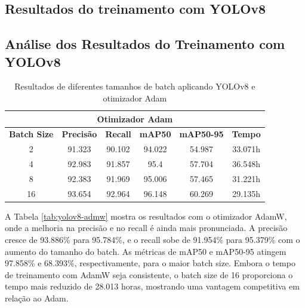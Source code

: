 \subsection{Resultados do treinamento com YOLOv8}

\subsection{Análise dos Resultados do Treinamento com YOLOv8}

\begin{table}[!hbt]
    \centering
    \begin{tabular}{|c|c|c|c|c|c|}
    \hline
    \multicolumn{6}{|c|}{\textbf{Otimizador Adam}} \\ \hline
    \textbf{Batch Size} & \textbf{Precisão} & \textbf{Recall} & \textbf{mAP50} & \textbf{mAP50-95} & \textbf{Tempo} \\ \hline
    2                   & 91.323                       & 90.102                     & 94.022                     & 54.987                        & 33.071h                         \\ \hline
    4                   & 92.983                       & 91.857                     & 95.4                       & 57.704                        & 36.548h                         \\ \hline
    8                   & 92.383                       & 91.969                     & 95.006                     & 57.465                        & 31.221h                         \\ \hline
    16                  & 93.654                       & 92.964                     & 96.148                     & 60.269                        & 29.135h                         \\ \hline
    \end{tabular}
    \caption{Resultados de diferentes tamanhos de batch aplicando YOLOv8 e otimizador Adam}
    \label{tab:yolov8-adm}
\end{table}

A Tabela \ref{tab:yolov8-admw} mostra os resultados com o otimizador AdamW, onde a melhoria na precisão e no recall é ainda mais pronunciada. A precisão cresce de 93.886\% para 95.784\%, e o recall sobe de 91.954\% para 95.379\% com o aumento do tamanho do batch. As métricas de mAP50 e mAP50-95 atingem 97.858\% e 68.393\%, respectivamente, para o maior batch size. Embora o tempo de treinamento com AdamW seja consistente, o batch size de 16 proporciona o tempo mais reduzido de 28.013 horas, mostrando uma vantagem competitiva em relação ao Adam.

